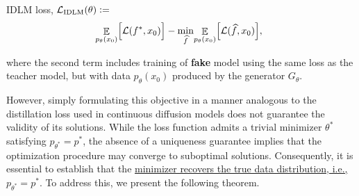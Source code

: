  \begin{Box1}{IDLM loss, $\mathcal{L}_{\text{IDLM}}(\theta) \vcentcolon=$}
    \vspace{-2pt}
    \begin{equation}
      \label{eq:inverse discrete diffusion distillation}
      \!\!\!\! \mathop{\EE}_{p_{\theta}(x_0)} \! \Big[\LC(f^*, x_0)\Big]
      - \min_{\widehat{f}}\! \mathop{\EE}_{p_{\theta}(x_0)}\! \Big[\LC(\widehat{f}, x_0)\Big],\!
    \end{equation}
  \end{Box1}
  where the second term includes training of \textbf{fake} model using the same loss as the teacher model, but with data $p_{\theta}(x_0)$ produced by the generator $G_{\theta}$.

  However, simply formulating this objective in a manner analogous to the distillation loss used in continuous diffusion models does not guarantee the validity of its solutions. While the loss function admits a trivial minimizer $\theta^*$ satisfying $p_{\theta^*} = p^*$, the absence of a uniqueness guarantee implies that the optimization procedure may converge to suboptimal solutions. Consequently, it is essential to establish that the \underline{minimizer recovers the true data distribution, i.e., ${p_{\theta^*} = p^*}$}. To address this, we present the following theorem. 

  
